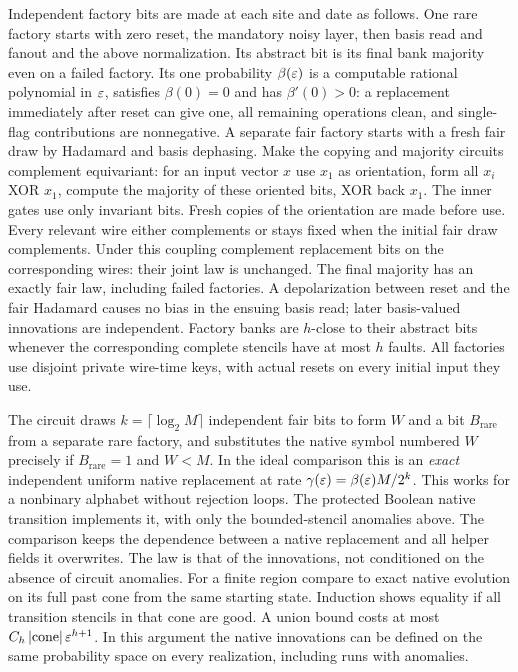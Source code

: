 Independent factory bits are made at each site and date as follows. One rare factory starts with zero reset, the mandatory noisy layer, then basis read and fanout and the above normalization. Its abstract bit is its final bank majority even on a failed factory. Its one probability \(\beta(\varepsilon)\) is a computable rational polynomial in \(\varepsilon\), satisfies \(\beta(0)=0\) and has \(\beta'(0)>0\): a replacement immediately after reset can give one, all remaining operations clean, and single-flag contributions are nonnegative. A separate fair factory starts with a fresh fair draw by Hadamard and basis dephasing. Make the copying and majority circuits complement equivariant: for an input vector \(x\) use \(x_{1}\) as orientation, form all \(x_{i}\) XOR \(x_{1}\), compute the majority of these oriented bits, XOR back \(x_{1}\). The inner gates use only invariant bits. Fresh copies of the orientation are made before use. Every relevant wire either complements or stays fixed when the initial fair draw complements. Under this coupling complement replacement bits on the corresponding wires: their joint law is unchanged. The final majority has an exactly fair law, including failed factories. A depolarization between reset and the fair Hadamard causes no bias in the ensuing basis read; later basis-valued innovations are independent. Factory banks are \(h\)-close to their abstract bits whenever the corresponding complete stencils have at most \(h\) faults. All factories use disjoint private wire-time keys, with actual resets on every initial input they use.

The circuit draws \(k=\lceil \log_2 M\rceil\) independent fair bits to form \(W\) and a bit \(B_{\mathrm{rare}}\) from a separate rare factory, and substitutes the native symbol numbered \(W\) precisely if \(B_{\mathrm{rare}}=1\) and \(W<M\). In the ideal comparison this is an \emph{exact} independent uniform native replacement at rate \(\gamma(\varepsilon)=\beta(\varepsilon)M/2^{k}\). This works for a nonbinary alphabet without rejection loops. The protected Boolean native transition implements it, with only the bounded-stencil anomalies above. The comparison keeps the dependence between a native replacement and all helper fields it overwrites. The law is that of the innovations, not conditioned on the absence of circuit anomalies. For a finite region compare to exact native evolution on its full past cone from the same starting state. Induction shows equality if all transition stencils in that cone are good. A union bound costs at most \(C_{h}\,|\mathrm{cone}|\,\varepsilon^{h+1}\). In this argument the native innovations can be defined on the same probability space on every realization, including runs with anomalies.

